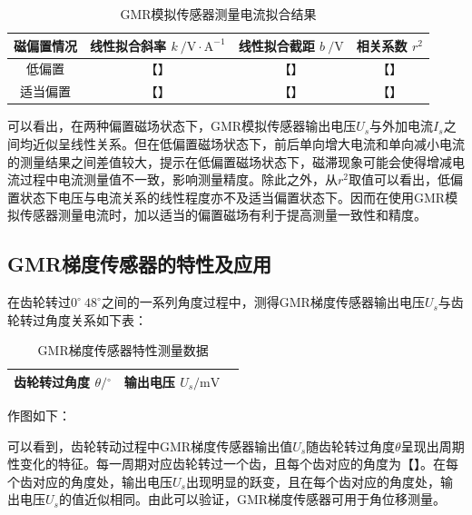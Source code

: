 \documentclass{thuemp}
\begin{document}
\begin{table}[H]
    \centering
    \captionnamefont{\wuhao\bf\heiti}
    \captiontitlefont{\wuhao\bf\heiti}
    \caption{GMR模拟传感器测量电流拟合结果} \label{tab:gmr_current_fit}
    \liuhao
    \begin{tabular}{|c|c|c|c|}
        \toprule
        磁偏置情况 & 线性拟合斜率 $k ~ /\mathrm{V\cdot A^{-1}} $ & 线性拟合截距 $b ~ /\mathrm{V}$ & 相关系数 $r^2$ \\ \hline
        低偏置 & 【】 & 【】 & 【】 \\ \hline
        适当偏置 & 【】 & 【】 & 【】 \\ \hline
        \midrule
        \bottomrule
    \end{tabular}
\end{table}

可以看出，在两种偏置磁场状态下，GMR模拟传感器输出电压$U_s$与外加电流$I_s$之间均近似呈线性关系。但在低偏置磁场状态下，前后单向增大电流和单向减小电流的测量结果之间差值较大，提示在低偏置磁场状态下，磁滞现象可能会使得增减电流过程中电流测量值不一致，影响测量精度。除此之外，从$r^2$取值可以看出，低偏置状态下电压与电流关系的线性程度亦不及适当偏置状态下。因而在使用GMR模拟传感器测量电流时，加以适当的偏置磁场有利于提高测量一致性和精度。

\subsection{GMR梯度传感器的特性及应用}

在齿轮转过$0^\circ~48^\circ$之间的一系列角度过程中，测得GMR梯度传感器输出电压$U_s$与齿轮转过角度关系如下表：

\begin{table}[H]
    \centering
    \captionnamefont{\wuhao\bf\heiti}
    \captiontitlefont{\wuhao\bf\heiti}
    \caption{GMR梯度传感器特性测量数据} \label{tab:gmr_gradient}
    \liuhao
    \begin{tabular}{|c|c|c|}
        \toprule
        齿轮转过角度 $\theta/\mathrm{^\circ}$ & 输出电压 $U_s/\mathrm{mV}$ \\ \hline
        \midrule
        \bottomrule
    \end{tabular}
\end{table}

作图如下：


可以看到，齿轮转动过程中GMR梯度传感器输出值$U_s$随齿轮转过角度$\theta$呈现出周期性变化的特征。每一周期对应齿轮转过一个齿，且每个齿对应的角度为【】。在每个齿对应的角度处，输出电压$U_s$出现明显的跃变，且在每个齿对应的角度处，输出电压$U_s$的值近似相同。由此可以验证，GMR梯度传感器可用于角位移测量。
\end{document}
